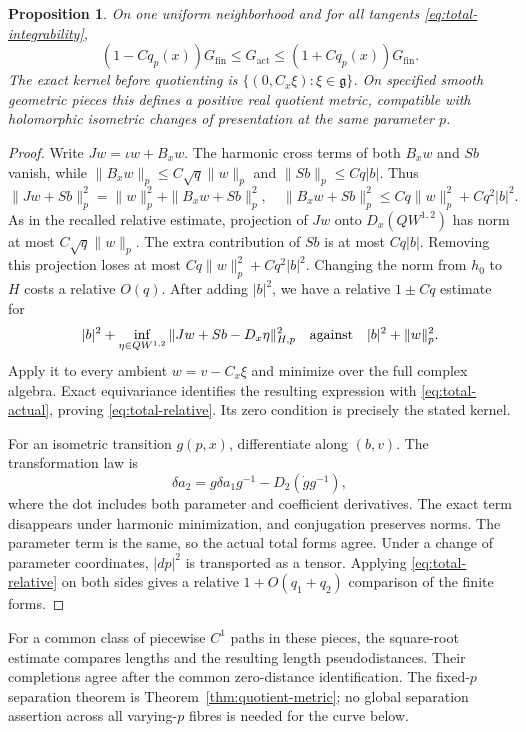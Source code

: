 \documentclass[11pt]{amsart}
\newtheorem{proposition}[theorem]{Proposition}
\theoremstyle{definition}
\theoremstyle{remark}
\begin{document}
\begin{proposition}\label{prop:total-metric}
On one uniform neighborhood and for all tangents
\eqref{eq:total-integrability},
\begin{equation}\label{eq:total-relative}
 (1-Cq_p(x))G_{\mathrm{fin}}\le G_{\mathrm{act}}
                         \le(1+Cq_p(x))G_{\mathrm{fin}}.
\end{equation}
The exact kernel before quotienting is
$\{(0,C_x\xi):\xi\in\mathfrak g\}$. On specified smooth
geometric pieces this defines a positive real quotient metric,
compatible with holomorphic isometric changes of presentation at the
same parameter $p$.
\end{proposition}
\begin{proof}
Write $Jw=\iota w+B_xw$. The harmonic cross terms of both
$B_xw$ and $Sb$ vanish, while
$\|B_xw\|_p\le C\sqrt q\|w\|_p$ and
$\|Sb\|_p\le Cq|b|$. Thus
\[
 \|Jw+Sb\|_p^2=\|w\|_p^2+\|B_xw+Sb\|_p^2,
 \quad \|B_xw+Sb\|_p^2\le Cq\|w\|_p^2+Cq^2|b|^2.
\]
As in the recalled relative estimate, projection of $Jw$ onto
$D_x(QW^{1,2})$ has norm at most $C\sqrt q\|w\|_p$.
The extra contribution of $Sb$ is at most $Cq|b|$. Removing this
projection loses at most $Cq\|w\|_p^2+Cq^2|b|^2$.
Changing the norm from $h_0$ to $H$ costs a relative $O(q)$.
After adding $|b|^2$, we have a relative $1\pm Cq$ estimate for
\[
 |b|^2+\inf_{\eta\in QW^{1,2}}
      \|Jw+Sb-D_x\eta\|_{H,p}^2
 \quad\hbox{against}\quad |b|^2+\|w\|_p^2.
\]
Apply it to every ambient $w=v-C_x\xi$ and minimize over the full
complex algebra. Exact equivariance identifies the resulting expression
with \eqref{eq:total-actual}, proving \eqref{eq:total-relative}.
Its zero condition is precisely the stated kernel.

For an isometric transition $g(p,x)$, differentiate along $(b,v)$.
The transformation law is
\[
 \delta a_2=g\delta a_1g^{-1}-D_2(\dot g g^{-1}),
\]
where the dot includes both parameter and coefficient derivatives.
The exact term disappears under harmonic minimization, and conjugation
preserves norms. The parameter term is the same, so the actual total
forms agree. Under a change of parameter coordinates, $|dp|^2$ is
transported as a tensor. Applying \eqref{eq:total-relative} on both
sides gives a relative $1+O(q_1+q_2)$ comparison of the finite forms.
\end{proof}

For a common class of piecewise $C^1$ paths in these pieces, the
square-root estimate compares lengths and the resulting length
pseudodistances. Their completions agree after the common zero-distance
identification. The fixed-$p$ separation theorem is
Theorem~\ref{thm:quotient-metric}; no global separation assertion
across all varying-$p$ fibres is needed for the curve below.
\end{document}
